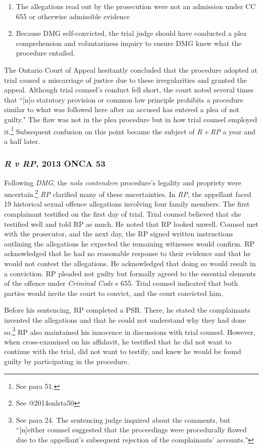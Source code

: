 \begin{enumerate}
    \item The allegations read out by the prosecution were not an admission under CC 655 or otherwise admissible evidence
    \item Because DMG self-convicted, the trial judge should have conducted a plea comprehension and voluntariness inquiry to ensure DMG knew what the procedure entailed.
\end{enumerate}

The Ontario Court of Appeal hesitantly concluded that the procedure adopted at trial caused a miscarriage of justice due to these irregularities and granted the appeal. Although trial counsel's conduct fell short, the court noted several times that ``[n]o statutory provision or common law principle prohibits a procedure similar to what was followed here after an accused has entered a plea of not guilty." The flaw was not in the plea procedure but in how trial counsel employed it.\footnote{See para 51.} Subsequent confusion on this point became the subject of \textit{R v RP} a year and a half later.

\subsubsection{\textit{R v RP}, 2013 ONCA 53}

Following \textit{DMG}, the \textit{nolo contendere} procedure's legality and propriety were uncertain.\footnote{See @2014onlsta50} \textit{RP} clarified many of these uncertainties. In \textit{RP}, the appellant faced 19 historical sexual offence allegations involving four family members. The first complainant testified on the first day of trial. Trial counsel believed that she testified well and told RP as much. He noted that RP looked unwell. Counsel met with the prosecutor, and the next day, the RP signed written instructions outlining the allegations he expected the remaining witnesses would confirm. RP acknowledged that he had no reasonable response to their evidence and that he would not contest the allegations. He acknowledged that doing so would result in a conviction. RP pleaded not guilty but formally agreed to the essential elements of the offence under \textit{Criminal Code} s 655. Trial counsel indicated that both parties would invite the court to convict, and the court convicted him.

Before his sentencing, RP completed a PSR. There, he stated the complainants invented the allegations and that he could not understand why they had done so.\footnote{See para 24. The sentencing judge inquired about the comments, but ``[n]either counsel suggested that the proceedings were procedurally flawed due to the appellant's subsequent rejection of the complainants' accounts."} RP also maintained his innocence in discussions with trial counsel. However, when cross-examined on his affidavit, he testified that he did not want to continue with the trial, did not want to testify, and knew he would be found guilty by participating in the procedure.


